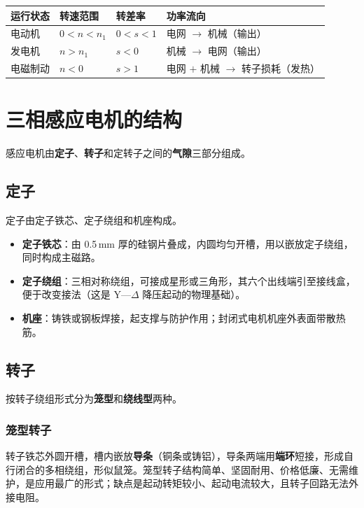 \begin{center}
\begin{tabular}{@{}llll@{}}
\toprule
运行状态 & 转速范围 & 转差率 & 功率流向 \\
\midrule
电动机 & $0<n<n_1$ & $0<s<1$ & 电网 $\rightarrow$ 机械（输出） \\
发电机 & $n>n_1$ & $s<0$ & 机械 $\rightarrow$ 电网（输出） \\
电磁制动 & $n<0$ & $s>1$ & 电网 $+$ 机械 $\rightarrow$ 转子损耗（发热） \\
\bottomrule
\end{tabular}
\end{center}


\section{三相感应电机的结构}

感应电机由\textbf{定子}、\textbf{转子}和定转子之间的\textbf{气隙}三部分组成。

\subsection{定子}
定子由定子铁芯、定子绕组和机座构成。
\begin{itemize}
  \item \textbf{定子铁芯}：由 0.5\,mm 厚的硅钢片叠成，内圆均匀开槽，用以嵌放定子绕组，同时构成主磁路。
  \item \textbf{定子绕组}：三相对称绕组，可接成星形或三角形，其六个出线端引至接线盒，便于改变接法（这是 Y—$\Delta$ 降压起动的物理基础）。
  \item \textbf{机座}：铸铁或钢板焊接，起支撑与防护作用；封闭式电机机座外表面带散热筋。
\end{itemize}

\subsection{转子}
按转子绕组形式分为\textbf{笼型}和\textbf{绕线型}两种。

\subsubsection{笼型转子}
转子铁芯外圆开槽，槽内嵌放\textbf{导条}（铜条或铸铝），导条两端用\textbf{端环}短接，形成自行闭合的多相绕组，形似鼠笼。笼型转子结构简单、坚固耐用、价格低廉、无需维护，是应用最广的形式；缺点是起动转矩较小、起动电流较大，且转子回路无法外接电阻。

